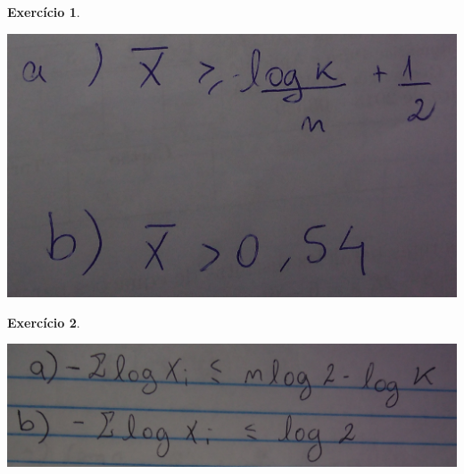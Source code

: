 \documentclass[letter,11pt]{article}
\newtheorem{exer}{Exercício}
\begin{document}
\begin{exer} \rm 
% 
% 
\end{exer}
\includegraphics[scale=0.1]{Ex10_gabarito}


\begin{exer} \rm 
% 
% 
% 
\end{exer}
\includegraphics[scale=0.1]{Ex11_gabarito}
\end{document}
